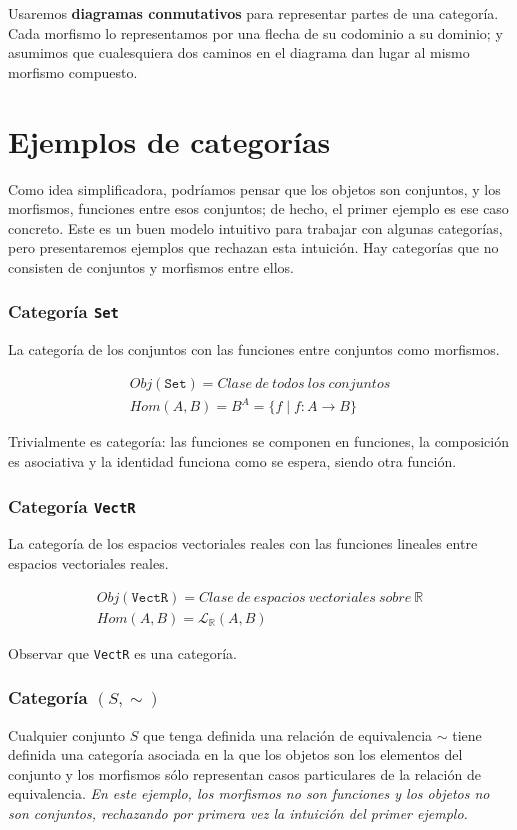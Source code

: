 \documentclass[11pt, fleqn, spanish]{book}
\begin{document}
Usaremos \textbf{diagramas conmutativos} para representar partes de una categoría.
Cada morfismo lo representamos por una flecha de su codominio a su dominio;
y asumimos que cualesquiera dos caminos en el diagrama dan lugar al mismo
morfismo compuesto.

\section{Ejemplos de categorías}
Como idea simplificadora, podríamos pensar que los objetos son
conjuntos, y los morfismos, funciones entre esos conjuntos; de hecho,
el primer ejemplo es ese caso concreto. Este es un buen modelo
intuitivo para trabajar con algunas categorías, pero presentaremos
ejemplos que rechazan esta intuición. Hay categorías que no consisten
de conjuntos y morfismos entre ellos.

\subsubsection{Categoría \texttt{Set}}
La categoría de los conjuntos con las funciones entre conjuntos como morfismos.

\begin{gather*}
  Obj(\texttt{Set}) = Clase\ de\ todos\ los\ conjuntos \\
  Hom(A,B)= B^A = \{f \;|\; f: A \rightarrow B \}
\end{gather*}

Trivialmente es categoría: las funciones se componen en funciones, la
composición es asociativa y la identidad funciona como se espera,
siendo otra función.

\subsubsection{Categoría \texttt{VectR}}
La categoría de los espacios vectoriales reales con las funciones lineales entre
espacios vectoriales reales.

\begin{gather*}
  Obj(\texttt{VectR}) = Clase\ de\ espacios\ vectoriales\ sobre\ \mathbb{R} \\
  Hom(A,B)= \mathcal{L}_{\mathbb{R}}(A,B)
\end{gather*}

\begin{exercise} 
  Observar que \texttt{VectR} es una categoría.
\end{exercise}

\subsubsection{Categoría \texttt{$(S,\sim)$}}
Cualquier conjunto $S$ que tenga definida una relación de equivalencia $\sim$ tiene
definida una categoría asociada en la que los objetos son los elementos del conjunto
y los morfismos sólo representan casos particulares de la relación de equivalencia.
\textit{En este ejemplo, los morfismos no son funciones y los objetos no son conjuntos,
  rechazando por primera vez la intuición del primer ejemplo.}
\end{document}
